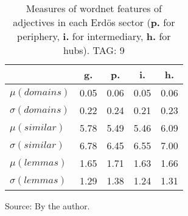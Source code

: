 \begin{table}[h!]
\begin{center}
	\caption{Measures of wordnet features of adjectives in each Erd\"os sector ({{\bf p.}} for periphery, {{\bf i.}} for intermediary, {{\bf h.}} for hubs). TAG: 9}\label{tab:wnas}
\begin{tabular}{| l || c | c | c | c |}\hline
 & {\bf g.} & {\bf p.} & {\bf i.} & {\bf h.} \\\hline\hline
$\mu(domains)$ & 0.05  & 0.06  & 0.05  & 0.06 \\
$\sigma(domains)$ & 0.22  & 0.24  & 0.21  & 0.23 \\\hline
$\mu(similar)$ & 5.78  & 5.49  & 5.46  & 6.09 \\
$\sigma(similar)$ & 6.78  & 6.45  & 6.55  & 7.00 \\\hline
$\mu(lemmas)$ & 1.65  & 1.71  & 1.63  & 1.66 \\
$\sigma(lemmas)$ & 1.29  & 1.38  & 1.24  & 1.31 \\\hline
\end{tabular}
\begin{flushleft}
		Source: By the author.\
\end{flushleft}
\end{center}
\end{table}
